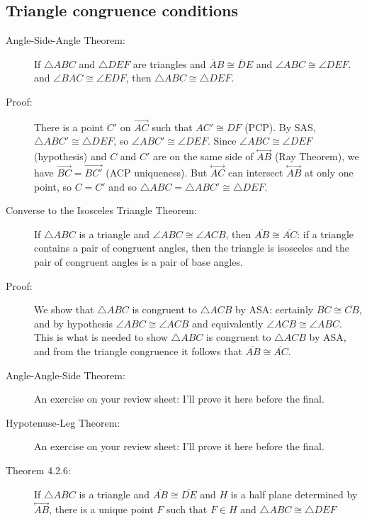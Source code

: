 \documentclass[12pt]{article}
\newcommand\Line[1]{\overset{\leftrightarrow}{#1}}
\begin{document}
\subsection{Triangle congruence conditions}

\begin{description}

\item[Angle-Side-Angle Theorem:]  If $\triangle ABC$ and $\triangle DEF$ are triangles and $\overline AB \cong \overline DE$ and $\angle ABC \cong \angle DEF$.
and $\angle BAC \cong \angle EDF$, then $\triangle ABC \cong \triangle DEF$.

\item[Proof:]  There is a point $C'$ on $\overrightarrow{AC}$ such that $AC' \cong DF$ (PCP).  By SAS, $\triangle ABC' \cong \triangle DEF$, so $\angle ABC' \cong \angle DEF$.
Since $\angle ABC \cong \angle DEF$ (hypothesis) and $C$ and $C'$ are on the same side of $\Line{AB}$ (Ray Theorem), we have $\overrightarrow{BC} = \overrightarrow{BC'}$ (ACP uniqueness).  But $\Line{AC}$ can intersect $\Line{AB}$ at only one point, so $C=C'$ and so $\triangle ABC = \triangle ABC' \cong \triangle DEF$.


\item[Converse to the Isosceles Triangle Theorem:]  If $\triangle ABC$ is a triangle and $\angle ABC \cong \angle ACB$, then $\overline {AB} \cong \overline{AC}$:  if a triangle contains a pair of congruent angles, then the triangle is isosceles and the pair of congruent angles is a pair of base angles.

\item[Proof:]  We show that $\triangle ABC$ is congruent to $\triangle ACB$ by ASA:  certainly $\overline{BC} \cong \overline{CB}$, and by hypothesis $\angle ABC \cong \angle ACB$
and equivalently $\angle ACB \cong \angle ABC$.  This is what is needed to show  $\triangle ABC$ is congruent to $\triangle ACB$ by ASA, and from the triangle congruence it
follows that $\overline{AB} \cong \overline{AC}$.

\item[Angle-Angle-Side Theorem:]

An exercise on your review sheet:  I'll prove it here before the final.

\item[Hypotenuse-Leg Theorem:]

An exercise on your review sheet:  I'll prove it here before the final.


\item[Theorem 4.2.6:] If $\triangle{ABC}$ is a triangle and $\overline{AB} \cong \overline{DE}$ and $H$ is a half plane determined by $\Line{AB}$, there is a unique point
$F$ such that $F \in H$ and $\triangle{ABC}\cong \triangle{DEF}$


\end{description}
\end{document}
